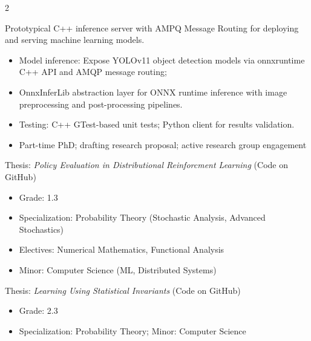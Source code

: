 \documentclass[10pt,a4paper,ragged2e,withhyper]{altacv}
\begin{document}
\begin{paracol}{2}
\par\divider


Prototypical C++ inference server with AMPQ Message Routing for deploying and serving machine learning models.

\begin{itemize}
\item Model inference: Expose YOLOv11 object detection models via onnxruntime C++ API and AMQP message routing;
\item OnnxInferLib abstraction layer for ONNX runtime inference with image preprocessing and post-processing pipelines.
\item Testing: C++ GTest-based unit tests; Python client for results validation.
\end{itemize}

\bigskip
\switchcolumn
{}
\label{sec:org9e3d77f}
\begin{itemize}
\item Part-time PhD; drafting research proposal; active research group engagement
\end{itemize}

\divider

Thesis: \textit{Policy Evaluation in Distributional Reinforcment Learning} (Code on GitHub)
\begin{itemize}
\item Grade: 1.3
\item Specialization: Probability Theory (Stochastic Analysis, Advanced Stochastics)
\item Electives: Numerical Mathematics, Functional Analysis
\item Minor: Computer Science (ML, Distributed Systems)
\end{itemize}
\divider

Thesis: \textit{Learning Using Statistical Invariants} (Code on GitHub)
\begin{itemize}
\item Grade: 2.3
\item Specialization: Probability Theory; Minor: Computer Science
\end{itemize}
\divider


\end{paracol}
\end{document}
